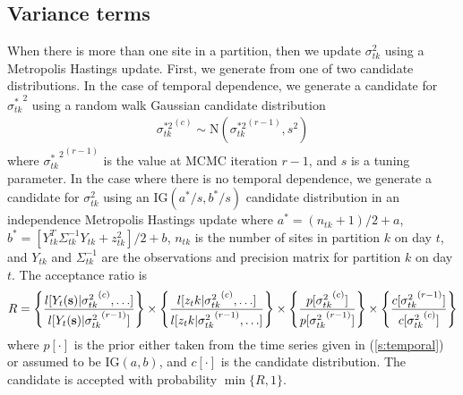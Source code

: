 \documentclass[11pt]{article}
\begin{document}
\subsection*{Variance terms}
When there is more than one site in a partition, then we update $\sigma^2_{tk}$ using a Metropolis Hastings update.
First, we generate from one of two candidate distributions.
In the case of temporal dependence, we generate a candidate for ${\sigma^*_{tk}}^2$ using a random walk Gaussian candidate distribution
\begin{align*}
  {\sigma^{*2}_{tk}}^{(c)} \sim \text{N}({\sigma^{*2}_{tk}}^{(r - 1)}, s^2)
\end{align*}
where ${{\sigma^*_{tk}}^2}^{(r - 1)}$ is the value at MCMC iteration $r - 1$, and $s$ is a tuning parameter.
In the case where there is no temporal dependence, we generate a candidate for $\sigma^2_{tk}$ using an IG$(a^*/s, b^*/s)$ candidate distribution in an independence Metropolis Hastings update where $a^* = (n_{tk} + 1) / 2 + a$, $b^* = [Y_{tk}^T \Sigma^{-1}_{tk} Y_{tk} + z_{tk}^2] / 2 + b$, $n_{tk}$ is the number of sites in partition $k$ on day $t$, and $Y_{tk}$ and $\Sigma^{-1}_{tk}$ are the observations and precision matrix for partition $k$ on day $t$.
The acceptance ratio is
\begin{align*}
  R = \left\{
    \frac{ l[Y_t(\mbox{\bf s}) | {\sigma^2_{tk}}^{(c)}, \ldots] }
         { l[Y_t(\mbox{\bf s}) | {\sigma^2_{tk}}^{(r - 1)}]}
    \right\} \times \left\{
    \frac{ l[z_tk | {\sigma^2_{tk}}^{(c)}, \ldots] }
         { l[z_tk | {\sigma^2_{tk}}^{(r - 1)}, \ldots] }
    \right\} \times \left\{
    \frac{ p[ {\sigma^2_{tk}}^{(c)} ] }
         { p[ {\sigma^2_{tk}}^{(r - 1)}] }
    \right\} \times \left\{
    \frac{ c[ {\sigma^2_{tk}}^{(r - 1)}] }
         { c[ {\sigma^2_{tk}}^{(c)}]}
    \right\}
\end{align*}
where $p[\cdot]$ is the prior either taken from the time series given in (\ref{s:temporal}) or assumed to be IG$(a, b)$, and $c[\cdot]$ is the candidate distribution.
The candidate is accepted with probability $\min\{R, 1\}$.
\end{document}
